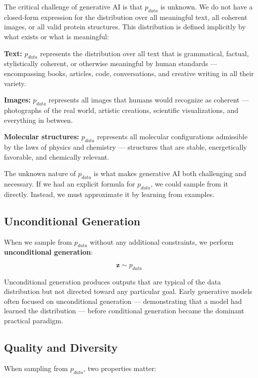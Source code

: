 \documentclass{book}
\begin{document}
The critical challenge of generative AI is that $p_{data}$ is unknown. We do
not have a closed-form expression for the distribution over all meaningful text,
all coherent images, or all valid protein structures. This distribution is
defined implicitly by what exists or what is meaningful:

\textbf{Text:} $p_{data}$ represents the distribution over all text that is
grammatical, factual, stylistically coherent, or otherwise meaningful by human
standards --- encompassing books, articles, code, conversations, and creative
writing in all their variety.

\textbf{Images:} $p_{data}$ represents all images that humans would recognize
as coherent --- photographs of the real world, artistic creations, scientific
visualizations, and everything in between.

\textbf{Molecular structures:} $p_{data}$ represents all molecular
configurations admissible by the laws of physics and chemistry --- structures
that are stable, energetically favorable, and chemically relevant.

The unknown nature of $p_{data}$ is what makes generative AI both challenging
and necessary. If we had an explicit formula for $p_{data}$, we could sample
from it directly. Instead, we must approximate it by learning from examples.

\subsection{Unconditional Generation}

When we sample from $p_{data}$ without any additional constraints, we perform
\textbf{unconditional generation}:

\begin{equation}
\mathbf{z} \sim p_{data}
\end{equation}

Unconditional generation produces outputs that are typical of the data
distribution but not directed toward any particular goal. Early generative
models often focused on unconditional generation --- demonstrating that a model
had learned the distribution --- before conditional generation became the
dominant practical paradigm.

\subsection{Quality and Diversity}

When sampling from $p_{data}$, two properties matter:
\end{document}
